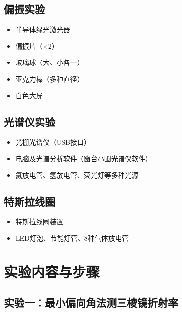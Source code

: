 \documentclass[UTF8]{article}
\begin{document}
\subsection{偏振实验}
\begin{itemize}
    \item 半导体绿光激光器
    \item 偏振片（$\times$2）
    \item 玻璃球（大、小各一）
    \item 亚克力棒（多种直径）
    \item 白色大屏
\end{itemize}

\subsection{光谱仪实验}
\begin{itemize}
    \item 光栅光谱仪（USB接口）
    \item 电脑及光谱分析软件（窗台小圃光谱仪软件）
    \item 氦放电管、氢放电管、荧光灯等多种光源
\end{itemize}

\subsection{特斯拉线圈}
\begin{itemize}
    \item 特斯拉线圈装置
    \item LED灯泡、节能灯管、8种气体放电管
\end{itemize}

\section{实验内容与步骤}

\subsection{实验一：最小偏向角法测三棱镜折射率}
\end{document}
